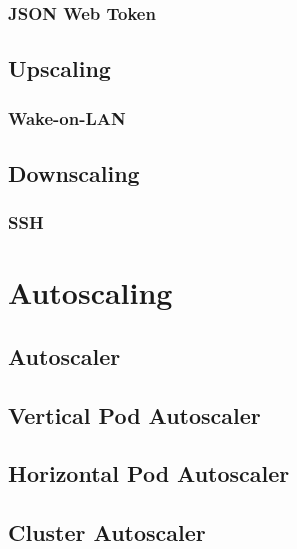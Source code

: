 \subsubsection{JSON Web Token}
\label{subsubsec:implementation_server_node_registration_json_web_token}

\subsection{Upscaling}
\label{subsec:implementation_server_upscaling}

\subsubsection{Wake-on-LAN}
\label{subsubsec:implementation_server_scale_up_wake_on_lan}

\subsection{Downscaling}
\label{subsec:implementation_server_downscaling}

\subsubsection{SSH}
\label{subsubsec:implementation_server_scale_up_ssh}

\section{Autoscaling}
\label{sec:implementation_autoscaling}

\subsection{Autoscaler}
\label{subsec:implementation_autoscaling_autoscaler}

\subsection{Vertical Pod Autoscaler}
\label{subsec:implementation_autoscaling_vertical_pod_autoscaler}

\subsection{Horizontal Pod Autoscaler}
\label{subsec:implementation_autoscaling_horizontal_pod_autoscaler}

\subsection{Cluster Autoscaler}
\label{subsec:implementation_autoscaling_cluster_autoscaler}

